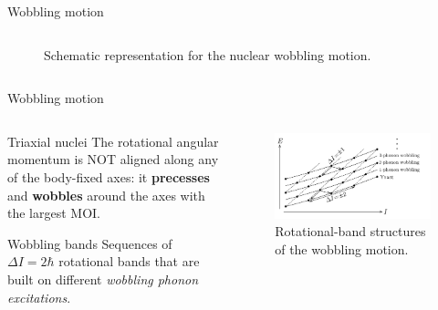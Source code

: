 \documentclass{beamer}
\begin{document}
\begin{frame}{Wobbling motion}
\begin{columns}
\begin{column}{0.6\textwidth}
\begin{figure}
          \caption{Schematic representation for the nuclear wobbling motion.}
          \label{wobbling_picture}
      \end{figure}
  \end{column}
  \end{columns}
\end{frame}


\begin{frame}{Wobbling motion}
  \begin{columns}
    \begin{column}{0.47\textwidth}
    \begin{block}{Triaxial nuclei}
    The rotational angular momentum is NOT aligned along any of the body-fixed axes: it \textbf{precesses} and \textbf{wobbles} around the axes with the largest MOI. 
    \end{block}
  \begin{block}{Wobbling bands}
  Sequences of $\Delta I=2\hbar$ rotational bands that are built on different \textit{wobbling phonon excitations}.
  \end{block}
    \end{column}
    \begin{column}{0.53\textwidth}  %
   \begin{figure}
     \centering
     \includegraphics[scale=0.15]{figs/wobblingBands.png}
     \caption{Rotational-band structures of the wobbling motion.}
   \end{figure}
    \end{column}
    \end{columns}
\end{frame}
\end{document}
